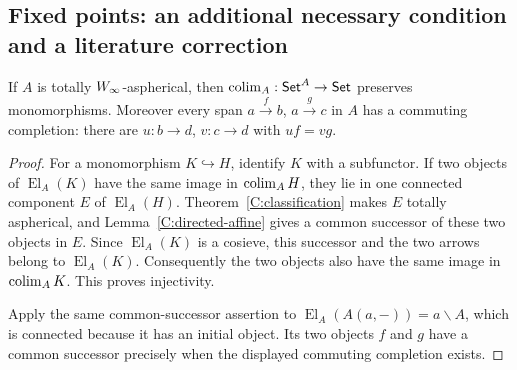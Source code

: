 \subsection{Fixed points: an additional necessary condition and a literature correction}

\begin{proposition}\label{D:set-monos}
If $A$ is totally $W_{\infty}$-aspherical, then
$\operatorname{colim}_A:\mathsf{Set}^A\to\mathsf{Set}$ preserves monomorphisms. Moreover every span
$a\xrightarrow{f}b$, $a\xrightarrow{g}c$ in $A$ has a commuting completion:
there are $u:b\to d$, $v:c\to d$ with $uf=vg$.
\end{proposition}
\begin{proof}
For a monomorphism $K\hookrightarrow H$, identify $K$ with a subfunctor.
If two objects of $\operatorname{El}_A(K)$ have the same image in
$\operatorname{colim}_AH$, they lie in one connected component $E$ of
$\operatorname{El}_A(H)$. Theorem~\ref{C:classification} makes $E$ totally
aspherical, and Lemma~\ref{C:directed-affine} gives a common successor of
these two objects in $E$. Since $\operatorname{El}_A(K)$ is a cosieve, this
successor and the two arrows belong to $\operatorname{El}_A(K)$.
Consequently the two objects also have the same image in $\operatorname{colim}_AK$.
This proves injectivity.

Apply the same common-successor assertion to
$\operatorname{El}_A(A(a,-))=a\backslash A$, which is connected because it
has an initial object. Its two objects $f$ and $g$ have a common successor
precisely when the displayed commuting completion exists.
\end{proof}

